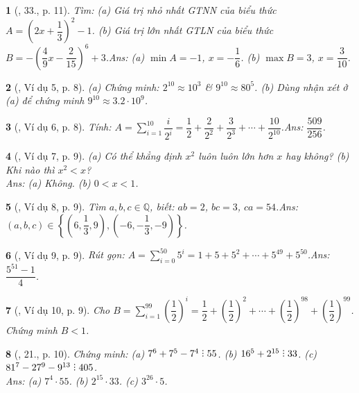 \documentclass{article}
\newtheorem{baitoan}{}
\DeclareRobustCommand{\divby}{%
	\mathrel{\vbox{\baselineskip.65ex\lineskiplimit0pt\hbox{.}\hbox{.}\hbox{.}}}%
}
\begin{document}
\begin{baitoan}[\cite{Tuyen_Toan_7}, 33., p. 11]
	Tìm: (a) Giá trị nhỏ nhất {\rm GTNN} của biểu thức $A = \left(2x + \dfrac{1}{3}\right)^2 - 1$. (b) Giá trị lớn nhất {\rm GTLN} của biểu thức $B = -\left(\dfrac{4}{9}x - \dfrac{2}{15}\right)^6 + 3$.\hfill{\sf Ans: (a) $\min A = -1$, $x = -\dfrac{1}{6}$. (b) $\max B = 3$, $x = \dfrac{3}{10}$.}
\end{baitoan}

\begin{baitoan}[\cite{Binh_Toan_7_tap_1}, Ví dụ 5, p. 8]
	(a) Chứng minh: $2^{10}\approx 10^3$ \& $9^{10}\approx 80^5$. (b) Dùng nhận xét ở (a) để chứng minh $9^{10}\approx 3.2\cdot 10^9$.	
\end{baitoan}

\begin{baitoan}[\cite{Binh_Toan_7_tap_1}, Ví dụ 6, p. 8]
	Tính: $A = \sum_{i=1}^{10} \dfrac{i}{2^i} = \dfrac{1}{2} + \dfrac{2}{2^2} + \dfrac{3}{2^3} + \cdots + \dfrac{10}{2^{10}}$.\hfill{\sf Ans: $\dfrac{509}{256}$.}
\end{baitoan}

\begin{baitoan}[\cite{Binh_Toan_7_tap_1}, Ví dụ 7, p. 9]
	(a) Có thể khẳng định $x^2$ luôn luôn lớn hơn $x$ hay không? (b) Khi nào thì $x^2 < x$?\\\mbox{}\hfill{\sf Ans: (a) Không. (b) $0 < x < 1$.}
\end{baitoan}

\begin{baitoan}[\cite{Binh_Toan_7_tap_1}, Ví dụ 8, p. 9]
	Tìm $a,b,c\in\mathbb{Q}$, biết: $ab = 2$, $bc = 3$, $ca = 54$.\hfill{\sf Ans: $(a,b,c)\in\left\{\left(6,\dfrac{1}{3},9\right),\left(-6,-\dfrac{1}{3},-9\right)\right\}$.}
\end{baitoan}

\begin{baitoan}[\cite{Binh_Toan_7_tap_1}, Ví dụ 9, p. 9]
	Rút gọn: $A = \sum_{i=0}^{50} 5^i = 1 + 5 + 5^2 + \cdots + 5^{49} + 5^{50}$.\hfill{\sf Ans: $\dfrac{5^{51} - 1}{4}$.}
\end{baitoan}

\begin{baitoan}[\cite{Binh_Toan_7_tap_1}, Ví dụ 10, p. 9]
	Cho $B = \sum_{i=1}^{99} \left(\dfrac{1}{2}\right)^i = \dfrac{1}{2} + \left(\dfrac{1}{2}\right)^2 + \cdots + \left(\dfrac{1}{2}\right)^{98} + \left(\dfrac{1}{2}\right)^{99}$. Chứng minh $B < 1$.
\end{baitoan}

\begin{baitoan}[\cite{Binh_Toan_7_tap_1}, 21., p. 10]
	Chứng minh: (a) $7^6 + 7^5 - 7^4\divby 55$. (b) $16^5 + 2^{15}\divby 33$. (c) $81^7 - 27^9 - 9^{13}\divby 405$.\\\mbox{}\hfill{\sf Ans: (a) $7^4\cdot 55$. (b) $2^{15}\cdot 33$. (c) $3^{26}\cdot 5$.}
\end{baitoan}
\end{document}

